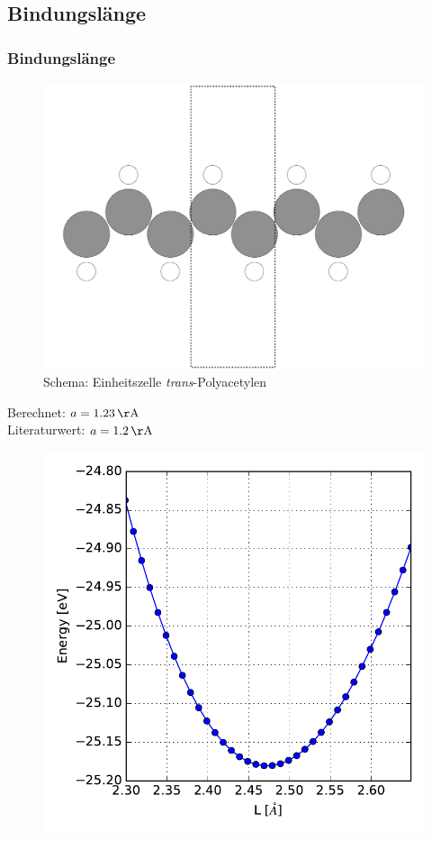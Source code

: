\subsection{Bindungslänge}
\begin{frame}
\frametitle{Bindungslänge}
\begin{minipage}{0.49\textwidth}
\begin{figure}[]
	\centering
	\includegraphics[width = .7\textwidth]{Images/polyacetylene/convergence/polyacetylene_nice_unit_cell}
	\captionsetup{justification = centering}
	\caption{Schema: Einheitszelle \emph{trans}-Polyacetylen}
\end{figure}
Berechnet: $a = \unit[1.23]{\AA}$\\
Literaturwert\footnotemark: $a = \unit[1.2]{\AA}$
\end{minipage}
\begin{minipage}{0.49\textwidth}
\begin{figure}
\centering
\includegraphics[width = .95\textwidth]{Images/polyacetylene/convergence/unit_cell_length}

\end{figure}
\end{minipage}
\end{frame}
